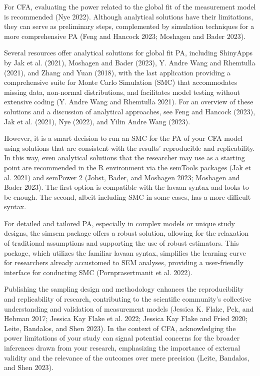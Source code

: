 \documentclass[
  a4paper,
]{article}
\begin{document}
For CFA, evaluating the power related to the global fit of the
measurement model is recommended (Nye 2022). Although analytical
solutions have their limitations, they can serve as preliminary steps,
complemented by simulation techniques for a more comprehensive PA (Feng
and Hancock 2023; Moshagen and Bader 2023).

Several resources offer analytical solutions for global fit PA,
including ShinyApps by Jak et al. (2021), Moshagen and Bader (2023), Y.
Andre Wang and Rhemtulla (2021), and Zhang and Yuan (2018), with the
last application providing a comprehensive suite for Monte Carlo
Simulation (SMC) that accommodates missing data, non-normal
distributions, and facilitates model testing without extensive coding
(Y. Andre Wang and Rhemtulla 2021). For an overview of these solutions
and a discussion of analytical approaches, see Feng and Hancock (2023),
Jak et al. (2021), Nye (2022), and Yilin Andre Wang (2023).

However, it is a smart decision to run an SMC for the PA of your CFA
model using solutions that are consistent with the results' reproducible
and replicability. In this way, even analytical solutions that the
researcher may use as a starting point are recommended in the R
environment via the semTools packages (Jak et al. 2021) and semPower 2
(Jobst, Bader, and Moshagen 2023; Moshagen and Bader 2023). The first
option is compatible with the lavaan syntax and looks to be enough. The
second, albeit including SMC in some cases, has a more difficult syntax.

For detailed and tailored PA, especially in complex models or unique
study designs, the simsem package offers a robust solution, allowing for
the relaxation of traditional assumptions and supporting the use of
robust estimators. This package, which utilizes the familiar lavaan
syntax, simplifies the learning curve for researchers already accustomed
to SEM analyses, providing a user-friendly interface for conducting SMC
(Pornprasertmanit et al. 2022).

Publishing the sampling design and methodology enhances the
reproducibility and replicability of research, contributing to the
scientific community's collective understanding and validation of
measurement models (Jessica K. Flake, Pek, and Hehman 2017; Jessica Kay
Flake et al. 2022; Jessica Kay Flake and Fried 2020; Leite, Bandalos,
and Shen 2023). In the context of CFA, acknowledging the power
limitations of your study can signal potential concerns for the broader
inferences drawn from your research, emphasizing the importance of
external validity and the relevance of the outcomes over mere precision
(Leite, Bandalos, and Shen 2023).
\end{document}
